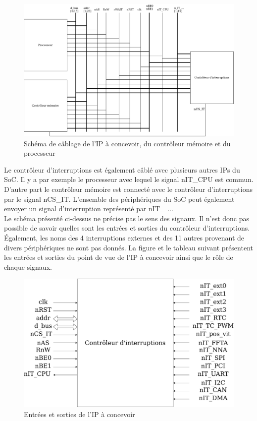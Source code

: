 \begin{figure}[H]
	\centering
	\includegraphics[width=1\linewidth]{figure/schema_cablage.png}
	\caption{Schéma de câblage de l'IP à concevoir, du contrôleur mémoire et du processeur}
	\label{fig:schema_cablage}
\end{figure}
	
Le contrôleur d'interruptions est également câblé avec plusieurs autres IPs du SoC.
Il y a par exemple le processeur avec lequel le signal nIT\_CPU est commun.
D'autre part le contrôleur mémoire est connecté avec le contrôleur d'interruptions par le signal nCS\_IT. L'ensemble des périphériques du SoC peut également envoyer un signal d'interruption représenté par nIT\_ $\dots$\\
	
Le schéma présenté ci-dessus ne précise pas le sens des signaux.
Il n'est donc pas possible de savoir quelles sont les entrées et sorties du contrôleur d'interruptions.
Également, les noms des 4 interruptions externes et des 11 autres provenant de divers périphériques ne sont pas donnés.
La figure et le tableau suivant présentent les entrées et sorties du point de vue de l'IP à concevoir ainsi que le rôle de chaque signaux. 
	
\begin{figure}[H]
	\centering
	\includegraphics[width=1\linewidth]{figure/delimitation_systeme.png}
	\caption{Entrées et sorties de l'IP à concevoir}
	\label{fig:inout_ip}
\end{figure}


